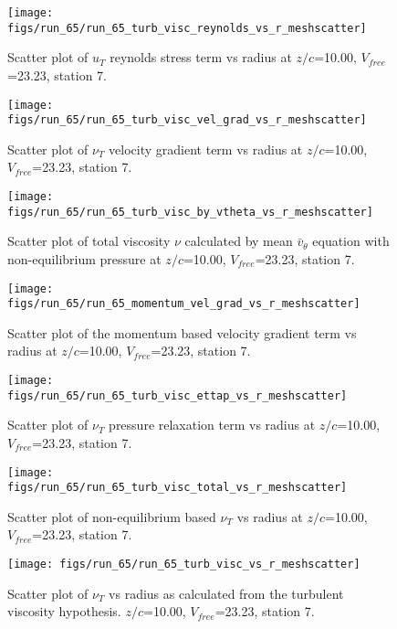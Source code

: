 \begin{figure}[H]
\centering
\texttt{[image: figs/run\_65/run\_65\_turb\_visc\_reynolds\_vs\_r\_meshscatter]}
\caption{Scatter plot of $
u_T$ reynolds stress term vs radius at $z/c$=10.00, $V_{free}$=23.23, station 7.}
\end{figure}


\begin{figure}[H]
\centering
\texttt{[image: figs/run\_65/run\_65\_turb\_visc\_vel\_grad\_vs\_r\_meshscatter]}
\caption{Scatter plot of $\nu_T$ velocity gradient term vs radius at $z/c$=10.00, $V_{free}$=23.23, station 7.}
\end{figure}


\begin{figure}[H]
\centering
\texttt{[image: figs/run\_65/run\_65\_turb\_visc\_by\_vtheta\_vs\_r\_meshscatter]}
\caption{Scatter plot of total viscosity $\nu$ calculated by mean $\bar{v}_{\theta}$ equation with non-equilibrium pressure at $z/c$=10.00, $V_{free}$=23.23, station 7.}
\end{figure}


\begin{figure}[H]
\centering
\texttt{[image: figs/run\_65/run\_65\_momentum\_vel\_grad\_vs\_r\_meshscatter]}
\caption{Scatter plot of the momentum based velocity gradient term vs radius at $z/c$=10.00, $V_{free}$=23.23, station 7.}
\end{figure}


\begin{figure}[H]
\centering
\texttt{[image: figs/run\_65/run\_65\_turb\_visc\_ettap\_vs\_r\_meshscatter]}
\caption{Scatter plot of $\nu_T$ pressure relaxation term vs radius at $z/c$=10.00, $V_{free}$=23.23, station 7.}
\end{figure}


\begin{figure}[H]
\centering
\texttt{[image: figs/run\_65/run\_65\_turb\_visc\_total\_vs\_r\_meshscatter]}
\caption{Scatter plot of non-equilibrium based $\nu_T$ vs radius at $z/c$=10.00, $V_{free}$=23.23, station 7.}
\end{figure}


\begin{figure}[H]
\centering
\texttt{[image: figs/run\_65/run\_65\_turb\_visc\_vs\_r\_meshscatter]}
\caption{Scatter plot of $\nu_T$ vs radius as calculated from the turbulent viscosity hypothesis. $z/c$=10.00, $V_{free}$=23.23, station 7.}
\end{figure}


